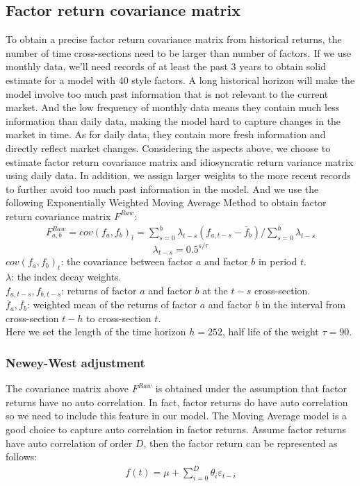 \documentclass[10pt]{article}
\begin{document}
\subsection{Factor return covariance matrix}
To obtain a precise factor return covariance matrix from historical returns, the number of time cross-sections need to be larger than number of factors. If we use monthly data, we’ll need records of at least the past 3 years to obtain solid estimate for a model with 40 style factors. A long historical horizon will make the model involve too much past information that is not relevant to the current market. And the low frequency of monthly data means they contain much less information than daily data, making the model hard to capture changes in the market in time. As for daily data, they contain more fresh information and directly reflect market changes. Considering the aspects above, we choose to estimate factor return covariance matrix and idiosyncratic return variance matrix using daily data.
In addition, we assign larger weights to the more recent records to further avoid too much past information in the model. And we use the following Exponentially Weighted Moving Average Method to obtain factor return covariance matrix $F^{Raw}$:
\begin{align}
F_{a,b}^{Raw}=cov\left( f_a,f_b \right) _t=\sum_{s=0}^h{\lambda _{t-s}\left( f_{a,t-s}-\bar{f}_b \right)}/\sum_{s=0}^h{\lambda _{t-s}}
\end{align}
$$
\lambda _{t-s}=0.5^{s/\tau}
$$
$cov\left( f_a,f_b \right) _t$: the covariance between factor $a$ and factor $b$ in period $t$. \\
$\lambda $: the index decay weights. \\
$f_{a,t-s},f_{b,t-s}$: returns of factor $a$ and factor $b$ at the $t-s$ cross-section. \\
$\overline{f}_a,\overline{f_b}$: weighted mean of the returns of factor $a$ and factor $b$ in the interval from cross-section $t-h$  to cross-section $t$.\\
Here we set the length of the time horizon $h=252$, half life of the weight $\tau=90$.

\subsubsection{Newey-West adjustment}
The covariance matrix above $F^{Raw}$ is obtained under the assumption that factor returns have no auto correlation. In fact, factor returns do have auto correlation so we need to include this feature in our model.
The Moving Average model is a good choice to capture auto correlation in factor returns. Assume factor returns have auto correlation of order $D$, then the factor return can be represented as follows:
\begin{align}
f\left( t \right) =\mu +\sum_{i=0}^D{\theta _i\varepsilon _{t-i}}
\end{align}
\end{document}
